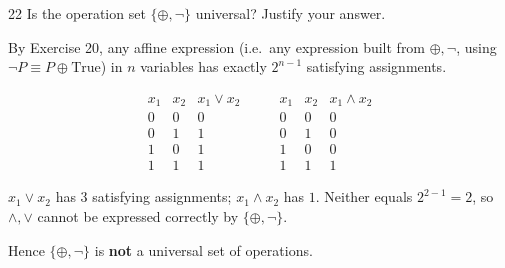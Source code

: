 \documentclass[11pt]{article}
\begin{document}
\begin{exercise}{22}
    Is the operation set $\{\oplus, \neg\}$ universal? Justify your
    answer.
\end{exercise}

\begin{solution}
By Exercise 20, any affine expression (i.e.\ any expression built from $\oplus,\neg$, using $\neg P\equiv P\oplus\text{True}$) in $n$ variables has exactly $2^{n-1}$ satisfying assignments.

\[
\begin{array}{cc|c}
x_1 & x_2 & x_1\vee x_2\\
\hline
0&0&0\\
0&1&1\\
1&0&1\\
1&1&1
\end{array}
\qquad
\begin{array}{cc|c}
x_1 & x_2 & x_1\wedge x_2\\
\hline
0&0&0\\
0&1&0\\
1&0&0\\
1&1&1
\end{array}
\]

$x_1\vee x_2$ has $3$ satisfying assignments; $x_1\wedge x_2$ has $1$. Neither equals $2^{2-1}=2$, so $\wedge,\vee$ cannot be expressed correctly by $\{\oplus,\neg\}$.

Hence $\{\oplus,\neg\}$ is \textbf{not} a universal set of operations.
\end{solution}
\end{document}
